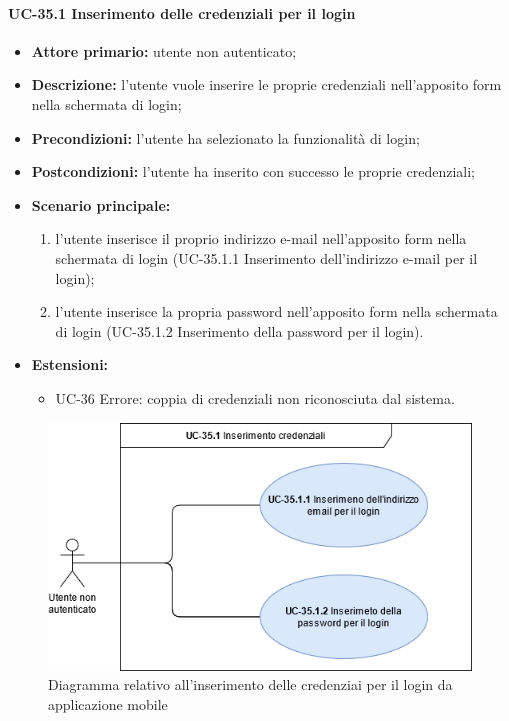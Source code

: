 \paragraph{UC-35.1 Inserimento delle credenziali per il login}

	\begin{itemize}
		\item \textbf{Attore primario:} utente non autenticato;

		\item \textbf{Descrizione:} l'utente vuole inserire le proprie credenziali nell'apposito form nella schermata di login;

		\item \textbf{Precondizioni:} l'utente ha selezionato la funzionalità di login;

		\item \textbf{Postcondizioni:} l'utente ha inserito con successo le proprie credenziali;

		\item \textbf{Scenario principale:}
	  		\begin{enumerate}
		  		\item l'utente inserisce il proprio indirizzo e-mail nell'apposito form nella schermata di login (UC-35.1.1 Inserimento dell'indirizzo e-mail per il login); 
		  		\item l'utente inserisce la propria password nell'apposito form nella schermata di login (UC-35.1.2 Inserimento della password per il login).
	  		\end{enumerate}
	    \item \textbf{Estensioni:}
	  		\begin{itemize}
		  		\item UC-36 Errore: coppia di credenziali non riconosciuta dal sistema.
	  		\end{itemize}
	\end{itemize}

	\begin{figure}[H]
		\centering
		  \includegraphics[scale=0.50]{src/CasiDUso/immagini/InserimentocredenzialiMobile.png}
		\caption{Diagramma relativo all'inserimento delle credenziai per il login da applicazione mobile}
	\end{figure}


